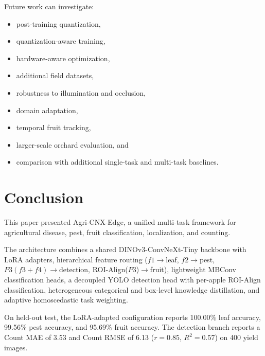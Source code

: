 \documentclass[preprint,12pt]{elsarticle}
\begin{document}
Future work can investigate:

\begin{itemize}

\item post-training quantization,

\item quantization-aware training,

\item hardware-aware optimization,

\item additional field datasets,

\item robustness to illumination and occlusion,

\item domain adaptation,

\item temporal fruit tracking,

\item larger-scale orchard evaluation, and

\item comparison with additional single-task and multi-task baselines.

\end{itemize}


\section{Conclusion}
\label{sec:conclusion}

This paper presented Agri-CNX-Edge, a unified multi-task framework for
agricultural disease, pest, fruit classification, localization, and
counting.

The architecture combines a shared DINOv3-ConvNeXt-Tiny backbone with
LoRA adapters, hierarchical feature routing ($f1\!\rightarrow\!$leaf,
$f2\!\rightarrow\!$pest, $P3(f3{+}f4)\!\rightarrow\!$detection,
ROI-Align($P3$)$\!\rightarrow\!$fruit), lightweight MBConv
classification heads, a decoupled YOLO detection head with per-apple
ROI-Align classification, heterogeneous categorical and box-level
knowledge distillation, and adaptive homoscedastic task weighting.

On held-out test, the LoRA-adapted configuration reports 100.00\%
leaf accuracy, 99.56\% pest accuracy, and 95.69\% fruit accuracy. The
detection branch reports a Count MAE of 3.53 and Count RMSE of 6.13
($r{=}0.85$, $R^2{=}0.57$) on 400 yield images.
\end{document}
